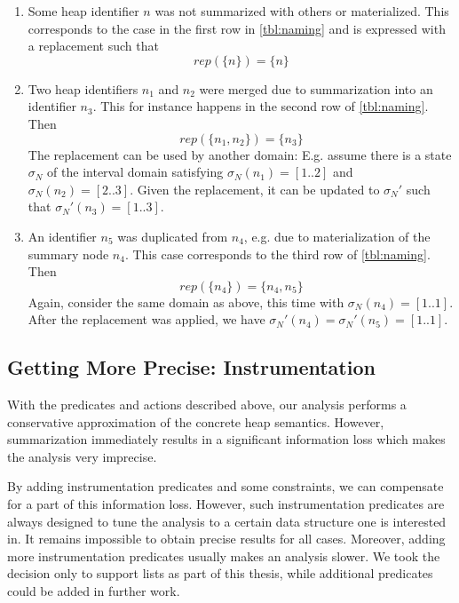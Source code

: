 \documentclass[11pt,a4paper,english]{article}
\begin{document}
\begin{enumerate}
  \item Some heap identifier $n$ was not summarized with others or materialized.
    This corresponds to the case in the first row  in \autoref{tbl:naming} and is
    expressed with a replacement such that 
    \[
      rep(\{n\}) = \{n\}
    \]
  \item Two heap identifiers $n_1$ and $n_2$ were merged due to summarization
    into an identifier $n_3$. This for instance happens in the second row of
    \autoref{tbl:naming}. Then 
    \[
      rep(\{n_1,n_2\}) = \{n_3\}
    \]
    The replacement can be used by another domain: E.g. assume there is a state $\sigma_N$ of the interval domain satisfying $\sigma_N(n_1) = \left[ 1..2 \right]$ and $\sigma_N(n_2) = \left[ 2..3 \right]$. Given the replacement, it can be updated to $\sigma_N'$ such that $\sigma_N'(n_3) = \left[ 1..3 \right]$.

  \item An identifier $n_5$ was duplicated from $n_4$, e.g. due to
    materialization of the summary node $n_4$. This case corresponds to the
    third row of \autoref{tbl:naming}. Then
    \[
      rep(\{n_4\}) = \{n_4,n_5\}
    \]
  Again, consider the same domain as above, this time with $\sigma_N(n_4) = \left[ 1..1 \right]$. 
  After the replacement was applied, we have $\sigma_N'(n_4) = \sigma_N'(n_5) = \left[ 1..1 \right]$. 
\end{enumerate}




\subsection{Getting More Precise: Instrumentation}
\label{sct:instrumentation}
With the predicates and actions described above, our analysis performs
a conservative approximation of the concrete heap semantics. However,
summarization immediately results in a significant information loss which makes
the analysis very imprecise.

By adding instrumentation predicates and some constraints, we can compensate for a part of this
information loss. However, such instrumentation predicates are always
designed to tune the analysis to a certain data structure one is interested in.
It remains impossible to obtain precise results for all cases. Moreover, adding
more instrumentation predicates usually makes an analysis slower. We took the
decision only to support lists as part of this thesis, while additional predicates
could be added in further work.
\end{document}
